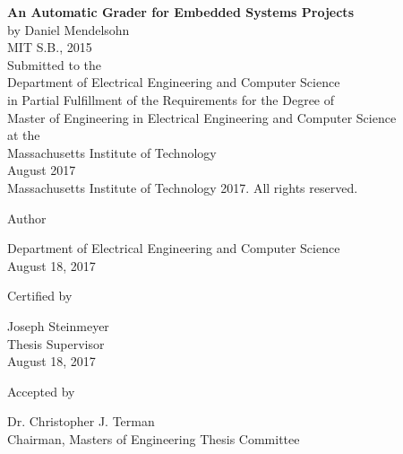 \documentclass[12pt]{article}
\newcommand{\mytitle}{\textbf{An Automatic Grader for Embedded Systems Projects}}
\newcommand{\mydate}{August 18, 2017}
\begin{document}
\begin{titlepage}

\centering
\mytitle \\
\vspace{12pt}
by Daniel Mendelsohn \\
MIT S.B., 2015 \\
\vspace{12pt}
Submitted to the \\
Department of Electrical Engineering and Computer Science \\
in Partial Fulfillment of the Requirements for the Degree of \\
\vspace{12pt}
Master of Engineering in Electrical Engineering and Computer Science \\
\vspace{12pt}
at the \\
\vspace{12pt}
Massachusetts Institute of Technology \\
\vspace{12pt}
August 2017 \\
\vspace{12pt}
\textcopyright \hspace{0.05in} Massachusetts Institute of Technology 2017.  All rights reserved. \\
\vspace{48pt}

Author \dotfill \\
\begin{flushright}
Department of Electrical Engineering and Computer Science \\
\mydate
\end{flushright}
\vspace{36pt}

Certified by \dotfill \\
\begin{flushright}
Joseph Steinmeyer \\
Thesis Supervisor \\
\mydate
\end{flushright}
\vspace{24pt}

Accepted by \dotfill \\
\begin{flushright}
Dr. Christopher J. Terman \\
Chairman, Masters of Engineering Thesis Committee
\end{flushright}

\end{titlepage}
\end{document}

